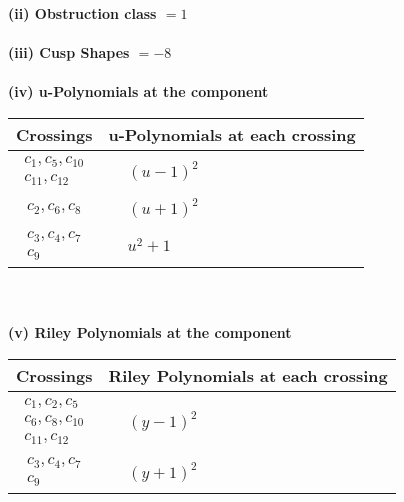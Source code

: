 \documentclass[1p]{elsarticle_modified}
\theoremstyle{definition}
\begin{document}
\flushleft \textbf{(ii) Obstruction class $= 1$}\\~\\
\flushleft \textbf{(iii) Cusp Shapes $= -8$}\\~\\
\newpage\renewcommand{\arraystretch}{1}
\flushleft \textbf{(iv) u-Polynomials at the component}\newline \\
\begin{tabular}{m{50pt}|m{274pt}}
Crossings & \hspace{64pt}u-Polynomials at each crossing \\
\hline $$\begin{aligned}c_{1},c_{5},c_{10}\\c_{11},c_{12}\end{aligned}$$&$\begin{aligned}
&(u-1)^2
\end{aligned}$\\
\hline $$\begin{aligned}c_{2},c_{6},c_{8}\end{aligned}$$&$\begin{aligned}
&(u+1)^2
\end{aligned}$\\
\hline $$\begin{aligned}c_{3},c_{4},c_{7}\\c_{9}\end{aligned}$$&$\begin{aligned}
&u^2+1
\end{aligned}$\\
\hline
\end{tabular}\\~\\
\newpage\renewcommand{\arraystretch}{1}
\flushleft \textbf{(v) Riley Polynomials at the component}\newline \\
\begin{tabular}{m{50pt}|m{274pt}}
Crossings & \hspace{64pt}Riley Polynomials at each crossing \\
\hline $$\begin{aligned}c_{1},c_{2},c_{5}\\c_{6},c_{8},c_{10}\\c_{11},c_{12}\end{aligned}$$&$\begin{aligned}
&(y-1)^2
\end{aligned}$\\
\hline $$\begin{aligned}c_{3},c_{4},c_{7}\\c_{9}\end{aligned}$$&$\begin{aligned}
&(y+1)^2
\end{aligned}$\\
\hline
\end{tabular}\\~\\
\end{document}
